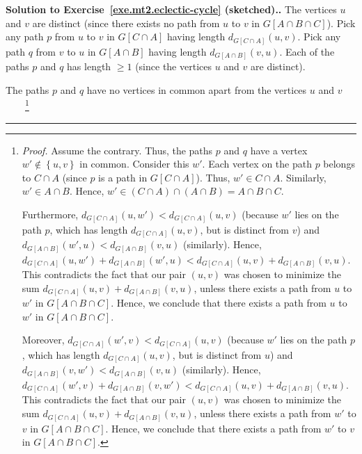 \documentclass[numbers=enddot,12pt,final,onecolumn,notitlepage]{scrartcl}%
\theoremstyle{definition}
\newenvironment{proof}[1][Proof]{\noindent\textbf{#1.} }{\ \rule{0.5em}{0.5em}}
\newcommand{\set}[1]{\left\{ #1 \right\}}
\newcommand{\tup}[1]{\left( #1 \right)}
\newcommand{\ive}[1]{\left[ #1 \right]}
\begin{document}
\begin{proof}[Solution to Exercise~\ref{exe.mt2.eclectic-cycle}
(sketched).]
The vertices $u$ and $v$ are distinct (since there exists no
path from $u$ to $v$ in $G \ive{A \cap B \cap C}$).
Pick any path $p$ from $u$ to $v$ in $G \ive{C \cap A}$ having length
$d_{G \ive{C \cap A}} \tup{u, v}$.
Pick any path $q$ from $v$ to $u$ in $G \ive{A \cap B}$ having length
$d_{G \ive{A \cap B}} \tup{v, u}$.
Each of the paths $p$ and $q$ has length $\geq 1$ (since the
vertices $u$ and $v$ are distinct).

The paths $p$ and $q$ have no vertices in common apart from the
vertices $u$ and $v$\ \ \ \ \footnote{\textit{Proof.} Assume the
  contrary.
  Thus, the paths $p$ and $q$ have a vertex $w' \notin \set{u, v}$ in
  common.
  Consider this $w'$.
  Each vertex on the path $p$ belongs to $C \cap A$ (since $p$ is a
  path in $G \ive{C \cap A}$).
  Thus, $w' \in C \cap A$. Similarly, $w' \in A \cap B$.
  Hence,
  $w' \in \tup{C \cap A} \cap \tup{A \cap B} = A \cap B \cap C$.
  \par
  Furthermore,
  $d_{G \ive{C \cap A}} \tup{u, w'} < d_{G \ive{C \cap A}} \tup{u, v}$
  (because $w'$ lies on the path $p$, which has length
  $d_{G \ive{C \cap A}} \tup{u, v}$, but is distinct from $v$) and
  $d_{G \ive{A \cap B}} \tup{w', u} < d_{G \ive{A \cap B}} \tup{v, u}$
  (similarly).
  Hence,
  $d_{G \ive{C \cap A}} \tup{u, w'} + d_{G \ive{A \cap B}} \tup{w', u}
  <
  d_{G \ive{C \cap A}} \tup{u, v} + d_{G \ive{A \cap B}} \tup{v, u}$.
  This contradicts the fact that our pair $\tup{u, v}$ was
  chosen to minimize the sum
  $d_{G \ive{C \cap A}} \tup{u, v} + d_{G \ive{A \cap B}} \tup{v, u}$,
  unless there exists a path from $u$ to $w'$ in
  $G \ive{A \cap B \cap C}$.
  Hence, we conclude that
  there exists a path from $u$ to $w'$ in $G \ive{A \cap B \cap C}$.
  \par
  Moreover,
  $d_{G \ive{C \cap A}} \tup{w', v} < d_{G \ive{C \cap A}} \tup{u, v}$
  (because $w'$ lies on the path $p$, which has length
  $d_{G \ive{C \cap A}} \tup{u, v}$, but is distinct from $u$) and
  $d_{G \ive{A \cap B}} \tup{v, w'} < d_{G \ive{A \cap B}} \tup{v, u}$
  (similarly).
  Hence,
  $d_{G \ive{C \cap A}} \tup{w', v} + d_{G \ive{A \cap B}} \tup{v, w'}
  <
  d_{G \ive{C \cap A}} \tup{u, v} + d_{G \ive{A \cap B}} \tup{v, u}$.
  This contradicts the fact that our pair $\tup{u, v}$ was
  chosen to minimize the sum
  $d_{G \ive{C \cap A}} \tup{u, v} + d_{G \ive{A \cap B}} \tup{v, u}$,
  unless there exists a path from $w'$ to $v$ in
  $G \ive{A \cap B \cap C}$.
  Hence, we conclude that
  there exists a path from $w'$ to $v$ in $G \ive{A \cap B \cap C}$.
  \par
}
\end{proof}
\end{document}
